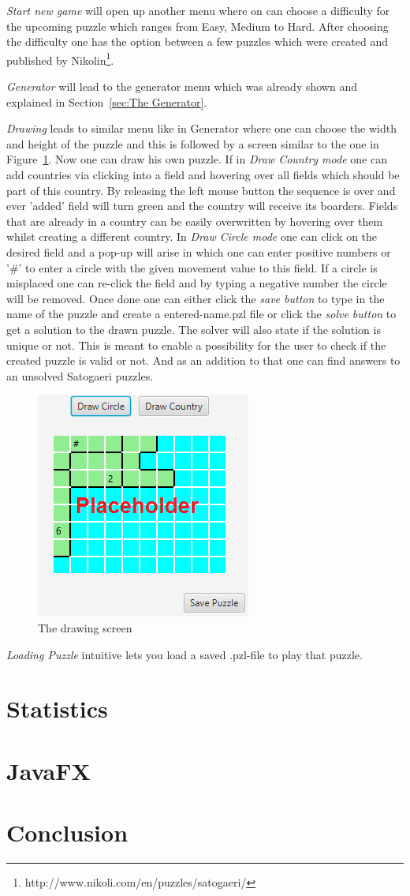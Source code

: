 \documentclass[a4paper,10pt]{paper}
\begin{document}
\emph{Start new game} will open up another menu where on can choose a difficulty for the upcoming puzzle which ranges from Easy, Medium to Hard. After choosing the difficulty one has the option between a few puzzles which were created and published by Nikolin\footnote{http://www.nikoli.com/en/puzzles/satogaeri/}.

\emph{Generator} will lead to the generator menu which was already shown and explained in Section~\ref{sec:The Generator}.

\emph{Drawing} leads to similar menu like in Generator where one can choose the width and height of the puzzle and this is followed by a screen similar to the one in Figure~\ref{fig:drawing_screen}.
Now one can draw his own puzzle. If in \emph{Draw Country mode} one can add countries via clicking into a field and hovering over all fields which should be part of this country. By releasing the left mouse button the sequence is over and ever 'added' field will turn green and the country will receive its boarders. Fields that are already in a country can be easily overwritten by hovering over them whilst creating a different country.
In \emph{Draw Circle mode} one can click on the desired field and a pop-up will arise in which one can enter positive numbers or '\#' to enter a circle with the given movement value to this field. If a circle is misplaced one can re-click the field and by typing a negative number the circle will be removed.
Once done one can either click the \emph{save button} to type in the name of the puzzle and create a entered-name.pzl file or click the \emph{solve button} to get a solution to the drawn puzzle. The solver will also state if the solution is unique or not. This is meant to enable a possibility for the user to check if the created puzzle is valid or not. And as an addition to that one can find answers to an unsolved Satogaeri puzzles.
\begin{figure}
  \centering
  \includegraphics[scale=1]{Pictures/drawing_screen.png} 
  \caption{The drawing screen}
  \label{fig:drawing_screen}
\end{figure}

\emph{Loading Puzzle} intuitive lets you load a saved .pzl-file to play that puzzle.

\section{Statistics}

\section{JavaFX}

\section{Conclusion}
\end{document}
